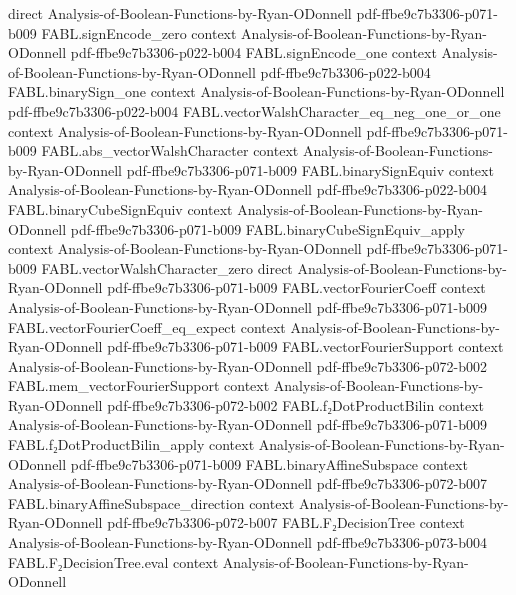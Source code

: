 \begin{theorem}
  {direct}
  {Analysis-of-Boolean-Functions-by-Ryan-ODonnell}
  {pdf-ffbe9c7b3306-p071-b009}
\proofstep
  {FABL.signEncode_zero}
  {context}
  {Analysis-of-Boolean-Functions-by-Ryan-ODonnell}
  {pdf-ffbe9c7b3306-p022-b004}
\proofstep
  {FABL.signEncode_one}
  {context}
  {Analysis-of-Boolean-Functions-by-Ryan-ODonnell}
  {pdf-ffbe9c7b3306-p022-b004}
\proofstep
  {FABL.binarySign_one}
  {context}
  {Analysis-of-Boolean-Functions-by-Ryan-ODonnell}
  {pdf-ffbe9c7b3306-p022-b004}
\proofstep
  {FABL.vectorWalshCharacter_eq_neg_one_or_one}
  {context}
  {Analysis-of-Boolean-Functions-by-Ryan-ODonnell}
  {pdf-ffbe9c7b3306-p071-b009}
\proofstep
  {FABL.abs_vectorWalshCharacter}
  {context}
  {Analysis-of-Boolean-Functions-by-Ryan-ODonnell}
  {pdf-ffbe9c7b3306-p071-b009}
\proofstep
  {FABL.binarySignEquiv}
  {context}
  {Analysis-of-Boolean-Functions-by-Ryan-ODonnell}
  {pdf-ffbe9c7b3306-p022-b004}
\proofstep
  {FABL.binaryCubeSignEquiv}
  {context}
  {Analysis-of-Boolean-Functions-by-Ryan-ODonnell}
  {pdf-ffbe9c7b3306-p071-b009}
\proofstep
  {FABL.binaryCubeSignEquiv_apply}
  {context}
  {Analysis-of-Boolean-Functions-by-Ryan-ODonnell}
  {pdf-ffbe9c7b3306-p071-b009}
\proofstep
  {FABL.vectorWalshCharacter_zero}
  {direct}
  {Analysis-of-Boolean-Functions-by-Ryan-ODonnell}
  {pdf-ffbe9c7b3306-p071-b009}
\proofstep
  {FABL.vectorFourierCoeff}
  {context}
  {Analysis-of-Boolean-Functions-by-Ryan-ODonnell}
  {pdf-ffbe9c7b3306-p071-b009}
\proofstep
  {FABL.vectorFourierCoeff_eq_expect}
  {context}
  {Analysis-of-Boolean-Functions-by-Ryan-ODonnell}
  {pdf-ffbe9c7b3306-p071-b009}
\proofstep
  {FABL.vectorFourierSupport}
  {context}
  {Analysis-of-Boolean-Functions-by-Ryan-ODonnell}
  {pdf-ffbe9c7b3306-p072-b002}
\proofstep
  {FABL.mem_vectorFourierSupport}
  {context}
  {Analysis-of-Boolean-Functions-by-Ryan-ODonnell}
  {pdf-ffbe9c7b3306-p072-b002}
\proofstep
  {FABL.f₂DotProductBilin}
  {context}
  {Analysis-of-Boolean-Functions-by-Ryan-ODonnell}
  {pdf-ffbe9c7b3306-p071-b009}
\proofstep
  {FABL.f₂DotProductBilin_apply}
  {context}
  {Analysis-of-Boolean-Functions-by-Ryan-ODonnell}
  {pdf-ffbe9c7b3306-p071-b009}
\proofstep
  {FABL.binaryAffineSubspace}
  {context}
  {Analysis-of-Boolean-Functions-by-Ryan-ODonnell}
  {pdf-ffbe9c7b3306-p072-b007}
\proofstep
  {FABL.binaryAffineSubspace_direction}
  {context}
  {Analysis-of-Boolean-Functions-by-Ryan-ODonnell}
  {pdf-ffbe9c7b3306-p072-b007}
\proofstep
  {FABL.F₂DecisionTree}
  {context}
  {Analysis-of-Boolean-Functions-by-Ryan-ODonnell}
  {pdf-ffbe9c7b3306-p073-b004}
\proofstep
  {FABL.F₂DecisionTree.eval}
  {context}
  {Analysis-of-Boolean-Functions-by-Ryan-ODonnell}

\end{theorem}
